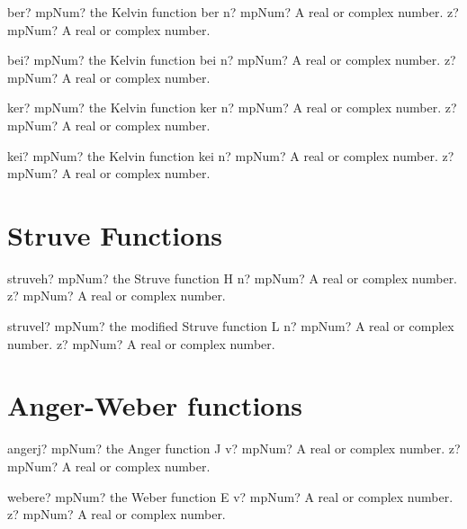 \documentclass[12pt,a4paper,openany]{book}
\begin{document}
\begin{mpFunctionsExtract}
\mpFunctionTwo
{ber? mpNum? the Kelvin function ber}
{n? mpNum? A real or complex number.}
{z? mpNum? A real or complex number.}
\end{mpFunctionsExtract}

\begin{mpFunctionsExtract}
\mpFunctionTwo
{bei? mpNum? the Kelvin function bei}
{n? mpNum? A real or complex number.}
{z? mpNum? A real or complex number.}
\end{mpFunctionsExtract}

\begin{mpFunctionsExtract}
\mpFunctionTwo
{ker? mpNum? the Kelvin function ker}
{n? mpNum? A real or complex number.}
{z? mpNum? A real or complex number.}
\end{mpFunctionsExtract}

\begin{mpFunctionsExtract}
\mpFunctionTwo
{kei? mpNum? the Kelvin function kei}
{n? mpNum? A real or complex number.}
{z? mpNum? A real or complex number.}
\end{mpFunctionsExtract}

\section{Struve Functions}

\begin{mpFunctionsExtract}
\mpFunctionTwo
{struveh? mpNum? the Struve function H}
{n? mpNum? A real or complex number.}
{z? mpNum? A real or complex number.}
\end{mpFunctionsExtract}

\begin{mpFunctionsExtract}
\mpFunctionTwo
{struvel? mpNum? the modified Struve function L}
{n? mpNum? A real or complex number.}
{z? mpNum? A real or complex number.}
\end{mpFunctionsExtract}

\section{Anger-Weber functions}

\begin{mpFunctionsExtract}
\mpFunctionTwo
{angerj? mpNum? the Anger function J}
{v? mpNum? A real or complex number.}
{z? mpNum? A real or complex number.}
\end{mpFunctionsExtract}

\begin{mpFunctionsExtract}
\mpFunctionTwo
{webere? mpNum? the Weber function E}
{v? mpNum? A real or complex number.}
{z? mpNum? A real or complex number.}
\end{mpFunctionsExtract}
\end{document}
